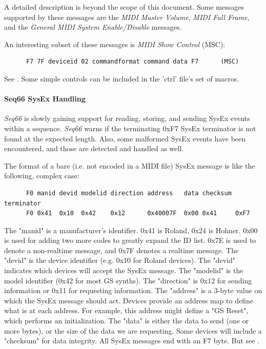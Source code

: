    A detailed description is beyond the scope of this document.
   Some messages supported by these messages are the
   \textsl{MIDI Master Volume},
   \textsl{MIDI Full Frame},
   and the \textsl{General MIDI System Enable/Disable}
   messages.

   An interesting subset of these messages is \textsl{MIDI Show Control}
   (MSC):

   \begin{verbatim}
      F7 7F deviceid 02 commandformat command data F7      (MSC)
   \end{verbatim}

   See \cite{msc}.
   Some simple controls can be included in the 'ctrl' file's set of macros.

\paragraph{Seq66 SysEx Handling}
\label{paragraph:midi_format_seq66_sysex_handling}

   \textsl{Seq66} is slowly gaining support for reading, storing, and
   sending SysEx events within a sequence.
   \textsl{Seq66} warns if the
   terminating 0xF7 SysEx terminator is not found at the expected length.
   Also, some malformed SysEx events have been encountered, and those are
   detected and handled as well.

   The format of a bare (i.e. not encoded in a MIDI file) SysEx message is
   like the following, complex case:

   \begin{verbatim}
      F0 manid devid modelid direction address   data checksum terminator
      F0 0x41  0x10  0x42    0x12      0x40007F  0x00 0x41     0xF7
   \end{verbatim}

   The "manid" is a manufacturer's identifier. 0x41 is Roland, 0x24 is
   Hohner. 0x00 is used for adding two more codes to greatly expand the ID
   list. 0x7E is used to denote a non-realtime message, and 0x7F denotes
   a realtime message.
   The "devid" is the device identifier (e.g. 0x10 for Roland devices).
   The "devid" indicates which devices will accept the SysEx message.
   The "modelid" is the model identifier (0x42 for most GS synths).
   The "direction" is 0x12 for sending information or 0x11 for requesting
   information.
   The "address" is a 3-byte value on which the SysEx message should act.
   Devices provide an address map to define what is at each address.
   For example, this address might define a "GS Reset", which performs
   an initialization.
   The "data" is either the data to send (one or more bytes), or the
   size of the data we are requesting.
   Some devices will include a "checksum" for data integrity.
   All SysEx messages end with an F7 byte.
   But see .

